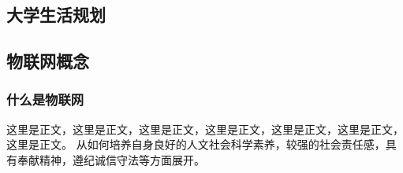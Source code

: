 \documentclass{hhutemplate}
\begin{document}
\begin{spacing}{1.5}
    \section{大学生活规划}

    \subsection{物联网概念}

    \subsubsection{什么是物联网}

    这里是正文，这里是正文，这里是正文，这里是正文，这里是正文，这里是正文，这里是正文。
    从如何培养自身良好的人文社会科学素养，较强的社会责任感，具有奉献精神，遵纪诚信守法等方面展开。

    \end{spacing}
\end{document}
